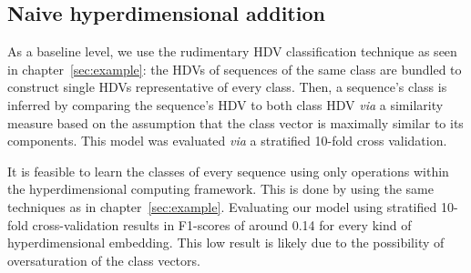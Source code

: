 \subsection*{Naive hyperdimensional addition}\label{ssec:purehdc}
As a baseline level, we use the rudimentary HDV classification technique as seen in chapter~\ref{sec:example}: the HDVs of sequences of the same class are bundled to construct single HDVs representative of every class. Then, a sequence's class is inferred by comparing the sequence's HDV to both class HDV \textit{via} a similarity measure based on the assumption that the class vector is maximally similar to its components. This model was evaluated \textit{via} a stratified 10-fold cross validation.
\begin{table}[h]
    \caption{\label{tab:phalpclass}Results of type classifications using the principal classification technique of hyperdimensional computing,an XGBoost classifier and OnlineHD implementations with several kinds of embeddings}
\end{table}

It is feasible to learn the classes of every sequence using only operations within the hyperdimensional computing framework. This is done by using the same techniques as in chapter~\ref{sec:example}. Evaluating our model using stratified 10-fold cross-validation results in F1-scores of around 0.14 for every kind of hyperdimensional embedding. This low result is likely due to the possibility of oversaturation of the class vectors.


